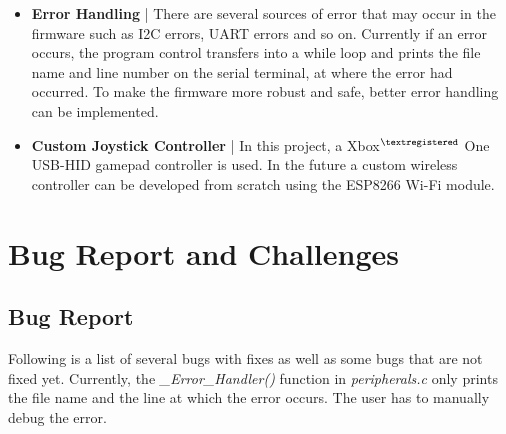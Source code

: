\documentclass[a4paper,12pt,oneside]{book}
\begin{document}
\begin{itemize}
\item \textbf{Error Handling} | There are several sources of error that may occur in the firmware such as I2C errors, UART errors and so on. Currently if an error occurs, the program control transfers into a while loop and prints the file name and line number on the serial terminal, at where the error had occurred. To make the firmware more robust and safe, better error handling can be implemented.\\  

\item \textbf{Custom Joystick Controller} | In this project, a Xbox$^{\tiny{\textregistered}}$ One \cite{xbox} USB-HID gamepad controller is used. In the future a custom wireless controller can be developed from scratch using the ESP8266 Wi-Fi module.

\end{itemize}

\chapter[Bug Report and Challenges]{Bug Report and Challenges}
\section{Bug Report}
\label{sec:bugs}

Following is a list of several bugs with fixes as well as some bugs that are not fixed yet. Currently, the \textit{{\_}Error{\_}Handler()} function in \textit{peripherals.c} only prints the file name and the line at which the error occurs. The user has to manually debug the error.\\
\end{document}
